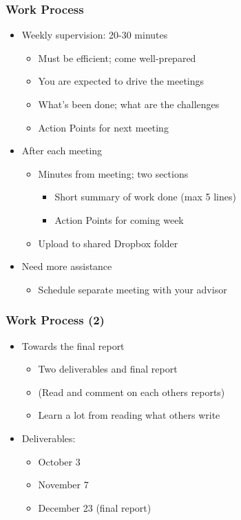 \documentclass[hyperref={pdfpagelabels=false}, aspectratio=1610]{beamer}
\begin{document}
\begin{frame}
\frametitle{Work Process}
\begin{block}{}
 \begin{itemize}
  \item Weekly supervision: 20-30 minutes
  \begin{itemize}
  	\item Must be efficient; come well-prepared
  	\item You are expected to drive the meetings
  	\item What's been done; what are the challenges
  	\item Action Points for next meeting
  \end{itemize}
  \item<2-> After each meeting
  \begin{itemize}
  	\item<2-> Minutes from meeting;  two sections
	\begin{itemize}
		\item<2-> Short summary of work done (max 5 lines)
		\item<2-> Action Points for coming week
	\end{itemize}
	\item<2-> Upload to shared Dropbox folder
  \end{itemize}
 \item<3-> Need more assistance
 \begin{itemize}
 	\item<3-> Schedule separate meeting with your advisor
 \end{itemize}
 \end{itemize}
\end{block}
\end{frame}


\begin{frame}
\frametitle{Work Process (2)}
\begin{block}{}
 \begin{itemize}
  \item Towards the final report
  \begin{itemize}
  	\item Two deliverables and final report
  	\item (Read and comment on each others reports)
  	\item Learn a lot from reading what others write
  \end{itemize}
  \item<2-> Deliverables:
  \begin{itemize}
  	\item<2-> October 3
  	\item<2-> November 7
  	\item<2-> December 23 (final report)
  \end{itemize}
 \end{itemize}
\end{block}
\end{frame}
\end{document}
